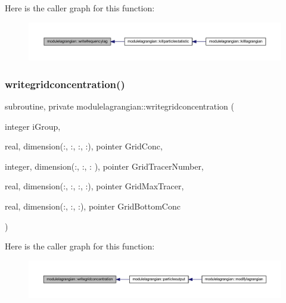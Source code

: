 Here is the caller graph for this function\+:\nopagebreak
\begin{figure}[H]
\begin{center}
\leavevmode
\includegraphics[width=350pt]{namespacemodulelagrangian_a73f212ed028e8e36231a715754b12d20_icgraph}
\end{center}
\end{figure}
\mbox{\label{namespacemodulelagrangian_ae773f710fefd7f114888e5227ec75766}} 
\subsubsection{\texorpdfstring{writegridconcentration()}{writegridconcentration()}}
{\footnotesize\ttfamily subroutine, private modulelagrangian\+::writegridconcentration (\begin{DoxyParamCaption}\item[{integer}]{i\+Group,  }\item[{real, dimension(\+:, \+:, \+:, \+:), pointer}]{Grid\+Conc,  }\item[{integer, dimension(\+:, \+:, \+:   ), pointer}]{Grid\+Tracer\+Number,  }\item[{real, dimension(\+:, \+:, \+:, \+:), pointer}]{Grid\+Max\+Tracer,  }\item[{real, dimension(\+:, \+:,    \+:), pointer}]{Grid\+Bottom\+Conc }\end{DoxyParamCaption})\hspace{0.3cm}{\ttfamily [private]}}

Here is the caller graph for this function\+:\nopagebreak
\begin{figure}[H]
\begin{center}
\leavevmode
\includegraphics[width=350pt]{namespacemodulelagrangian_ae773f710fefd7f114888e5227ec75766_icgraph}
\end{center}
\end{figure}
\mbox{\label{namespacemodulelagrangian_a34b406709c4bc499c1d075b26e741c0b}} 
